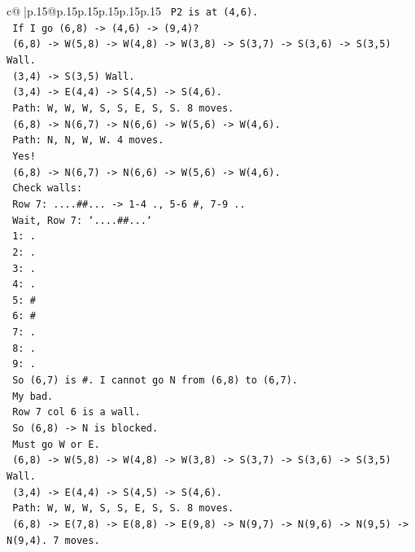 \documentclass{article}
\begin{document}
{\begin{supertabular}{c@{$\;$}|p{.15\linewidth}@{}p{.15\linewidth}p{.15\linewidth}p{.15\linewidth}p{.15\linewidth}p{.15\linewidth}}
{{{\texttt{    P2 is at (4,6).} \\
\texttt{    If I go (6,8) {-}> (4,6) {-}> (9,4)?} \\
\texttt{    (6,8) {-}> W(5,8) {-}> W(4,8) {-}> W(3,8) {-}> S(3,7) {-}> S(3,6) {-}> S(3,5) Wall.} \\
\texttt{    (3,4) {-}> S(3,5) Wall.} \\
\texttt{    (3,4) {-}> E(4,4) {-}> S(4,5) {-}> S(4,6).} \\
\texttt{    Path: W, W, W, S, S, E, S, S. 8 moves.} \\
\texttt{    (6,8) {-}> N(6,7) {-}> N(6,6) {-}> W(5,6) {-}> W(4,6).} \\
\texttt{    Path: N, N, W, W. 4 moves.} \\
\texttt{    Yes!} \\
\texttt{    (6,8) {-}> N(6,7) {-}> N(6,6) {-}> W(5,6) {-}> W(4,6).} \\
\texttt{    Check walls:} \\
\texttt{    Row 7: ....\#\#... {-}> 1{-}4 ., 5{-}6 \#, 7{-}9 ..} \\
\texttt{    Wait, Row 7: `....\#\#...`} \\
\texttt{    1: .} \\
\texttt{    2: .} \\
\texttt{    3: .} \\
\texttt{    4: .} \\
\texttt{    5: \#} \\
\texttt{    6: \#} \\
\texttt{    7: .} \\
\texttt{    8: .} \\
\texttt{    9: .} \\
\texttt{    So (6,7) is \#. I cannot go N from (6,8) to (6,7).} \\
\texttt{    My bad.} \\
\texttt{    Row 7 col 6 is a wall.} \\
\texttt{    So (6,8) {-}> N is blocked.} \\
\texttt{    Must go W or E.} \\
\texttt{    (6,8) {-}> W(5,8) {-}> W(4,8) {-}> W(3,8) {-}> S(3,7) {-}> S(3,6) {-}> S(3,5) Wall.} \\
\texttt{    (3,4) {-}> E(4,4) {-}> S(4,5) {-}> S(4,6).} \\
\texttt{    Path: W, W, W, S, S, E, S, S. 8 moves.} \\
\texttt{    (6,8) {-}> E(7,8) {-}> E(8,8) {-}> E(9,8) {-}> N(9,7) {-}> N(9,6) {-}> N(9,5) {-}> N(9,4). 7 moves.} \\
}}}
\end{supertabular}}
\end{document}
